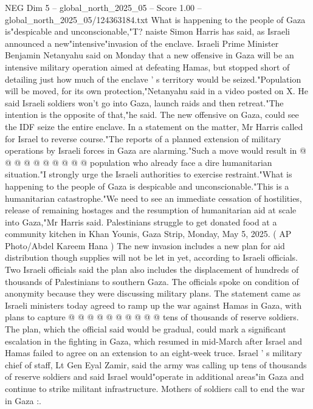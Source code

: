 \begin{textsample}{NEG Dim 5 – global\_north\_2025\_05 – Score 1.00 – global\_north\_2025\_05/124363184.txt}  \label{ex:f5_neg_374}
What is happening to the people of Gaza is"despicable and unconscionable,"T? naiste Simon Harris has said, as Israeli announced a new"intensive"invasion of the enclave.
Israeli Prime Minister Benjamin Netanyahu said on Monday that a new offensive in Gaza will be an intensive military operation aimed at defeating Hamas, but stopped short of detailing just how much of the enclave ' s territory would be seized."Population will be moved, for its own protection,"Netanyahu said in a video posted on X.
He said Israeli soldiers won't go into Gaza, launch raids and then retreat."The intention is the opposite of that,"he said.
The new offensive on Gaza, could see the IDF seize the entire enclave.
In a statement on the matter, Mr Harris called for Israel to reverse course."The reports of a planned extension of military operations by Israeli forces in Gaza are alarming."Such a move would result in @ @ @ @ @ @ @ @ @ @ population who already face a dire humanitarian situation."I strongly urge the Israeli authorities to exercise restraint."What is happening to the people of Gaza is despicable and unconscionable."This is a humanitarian catastrophe."We need to see an immediate cessation of hostilities, release of remaining hostages and the resumption of humanitarian aid at scale into Gaza,"Mr Harris said.
Palestinians struggle to get donated food at a community kitchen in Khan Younis, Gaza Strip, Monday, May 5, 2025. ( AP Photo/Abdel Kareem Hana ) The new invasion includes a new plan for aid distribution though supplies will not be let in yet, according to Israeli officials.
Two Israeli officials said the plan also includes the displacement of hundreds of thousands of Palestinians to southern Gaza.
The officials spoke on condition of anonymity because they were discussing military plans.
The statement came as Israeli ministers today agreed to ramp up the war against Hamas in Gaza, with plans to capture @ @ @ @ @ @ @ @ @ @ tens of thousands of reserve soldiers.
The plan, which the official said would be gradual, could mark a significant escalation in the fighting in Gaza, which resumed in mid-March after Israel and Hamas failed to agree on an extension to an eight-week truce.
Israel ' s military chief of staff, Lt Gen Eyal Zamir, said the army was calling up tens of thousands of reserve soldiers and said Israel would"operate in additional areas"in Gaza and continue to strike militant infrastructure.
Mothers of soldiers call to end the war in Gaza :.

\end{textsample}
